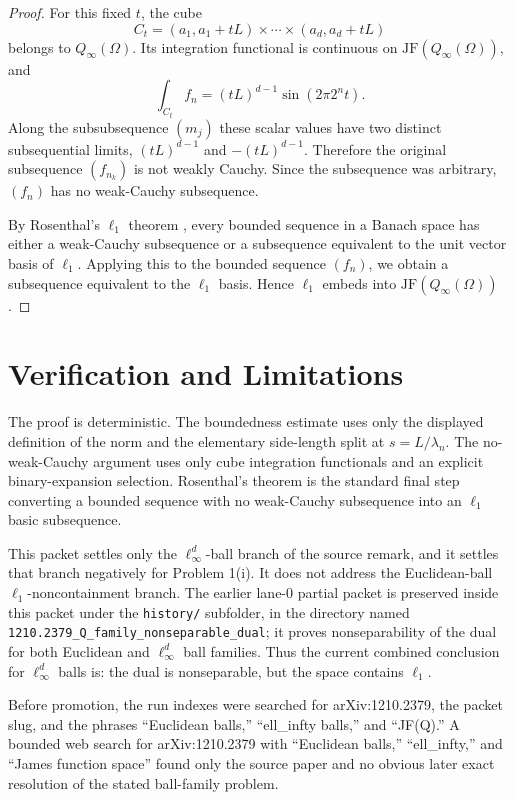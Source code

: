 \documentclass[11pt]{article}
\newcommand{\JF}{\mathrm{JF}}
\begin{document}
\begin{proof}
For this fixed $t$, the cube
\[
C_t=(a_1,a_1+tL)\times\cdots\times(a_d,a_d+tL)
\]
belongs to $Q_\infty(\Omega)$.  Its integration functional is continuous on
$\JF(Q_\infty(\Omega))$, and
\[
\int_{C_t} f_n
=(tL)^{d-1}\sin(2\pi 2^n t).
\]
Along the subsubsequence $(m_j)$ these scalar values have two distinct
subsequential limits, $(tL)^{d-1}$ and $-(tL)^{d-1}$.  Therefore the original
subsequence $(f_{n_k})$ is not weakly Cauchy.  Since the subsequence was
arbitrary, $(f_n)$ has no weak-Cauchy subsequence.

By Rosenthal's $\ell_1$ theorem \cite{Rosenthal}, every bounded sequence in a
Banach space has either a weak-Cauchy subsequence or a subsequence equivalent
to the unit vector basis of $\ell_1$.  Applying this to the bounded sequence
$(f_n)$, we obtain a subsequence equivalent to the $\ell_1$ basis.  Hence
$\ell_1$ embeds into $\JF(Q_\infty(\Omega))$.
\end{proof}

\section{Verification and Limitations}

The proof is deterministic.  The boundedness estimate uses only the displayed
definition of the norm and the elementary side-length split at
$s=L/\lambda_n$.  The no-weak-Cauchy argument uses only cube integration
functionals and an explicit binary-expansion selection.  Rosenthal's theorem is
the standard final step converting a bounded sequence with no weak-Cauchy
subsequence into an $\ell_1$ basic subsequence.

This packet settles only the $\ell_\infty^d$-ball branch of the source remark,
and it settles that branch negatively for Problem 1(i).  It does not address
the Euclidean-ball $\ell_1$-noncontainment branch.  The earlier lane-0 partial
packet is preserved inside this packet under the \texttt{history/} subfolder,
in the directory named \texttt{1210.2379\_Q\_family\_nonseparable\_dual};
it proves
nonseparability of the dual for both Euclidean and $\ell_\infty^d$ ball
families.  Thus the current combined conclusion for $\ell_\infty^d$ balls is:
the dual is nonseparable, but the space contains $\ell_1$.

Before promotion, the run indexes were searched for arXiv:1210.2379, the
packet slug, and the phrases ``Euclidean balls,'' ``ell\_infty balls,'' and
``JF(Q).''  A bounded web search for arXiv:1210.2379 with ``Euclidean balls,''
``ell\_infty,'' and ``James function space'' found only the source paper and
no obvious later exact resolution of the stated ball-family problem.
\end{document}
